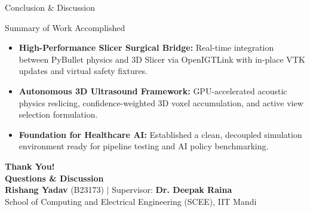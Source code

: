 \documentclass[aspectratio=169, 10pt]{beamer}
\begin{document}
\begin{frame}[c]{Conclusion \& Discussion}
    \centering
    \begin{block}{Summary of Work Accomplished}
        \begin{itemize}
            \item \textbf{High-Performance Slicer Surgical Bridge:} Real-time integration between PyBullet physics and 3D Slicer via OpenIGTLink with in-place VTK updates and virtual safety fixtures.
            \item \textbf{Autonomous 3D Ultrasound Framework:} GPU-accelerated acoustic physics reslicing, confidence-weighted 3D voxel accumulation, and active view selection formulation.
            \item \textbf{Foundation for Healthcare AI:} Established a clean, decoupled simulation environment ready for pipeline testing and AI policy benchmarking.
        \end{itemize}
    \end{block}

    \vspace{0.4cm}
    {\Huge \textbf{\textcolor{iitmaroon}{Thank You!}}}\\[0.6em]
    {\large \textbf{Questions \& Discussion}}\\[1.0em]
    \footnotesize
    \textbf{Rishang Yadav} (B23173) \quad $\vert$ \quad Supervisor: \textbf{Dr. Deepak Raina}\\
    School of Computing and Electrical Engineering (SCEE), IIT Mandi
\end{frame}
\end{document}
